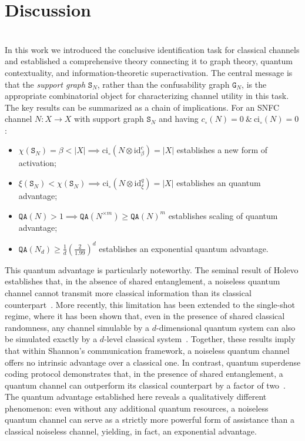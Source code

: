 \documentclass[12pt,a4paper]{article}
\begin{document}
\section{Discussion}\label{sec:discussion}

\vspace{-.35cm}\\ 

\noindent In this work we introduced the conclusive identification task for classical channels and established a comprehensive theory connecting it to graph theory, quantum contextuality, and information-theoretic superactivation. The central message is that the \emph{support graph} $\mathtt{S}_N$, rather than the confusability graph $\mathtt{G}_N$, is the appropriate combinatorial object for characterizing channel utility in this task. The key results can be summarized as a chain of implications. For an SNFC channel $N : X \to X$ with support graph $\mathtt{S}_N$ and having $c_\circ(N)=0~\&~\mathrm{ci}_\circ(N)=0$:
\begin{itemize}[itemsep=-0.15cm, parsep=0.15cm, topsep=2pt, leftmargin=1.0cm]
\item[$\checkmark$] $\chi(\mathtt{S}_N) = \beta < |X| \implies \mathrm{ci}_\circ(N \otimes \mathrm{id}^c_\beta) = |X|$ establishes a new form of activation;  
\item[$\checkmark$] $\xi(\mathtt{S}_N) < \chi(\mathtt{S}_N) \implies \mathrm{ci}_\circ(N \otimes \mathrm{id}^q_{\xi}) = |X|$ establishes an quantum advantage; 
\item[$\checkmark$] $\mathtt{QA}(N) > 1 \implies \mathtt{QA}(N^{\times m}) \geq \mathtt{QA}(N)^m$ establishes scaling of quantum advantage;
\item[$\checkmark$] $\mathtt{QA}(N_d)\geq \frac{1}{d}\left(\frac{2}{1.99}\right)^d$ establishes an exponential quantum advantage.
\end{itemize}
This quantum advantage is particularly noteworthy. The seminal result of Holevo establishes that, in the absence of shared entanglement, a noiseless quantum channel cannot transmit more classical information than its classical counterpart~\cite{Holevo1973}. More recently, this limitation has been extended to the single-shot regime, where it has been shown that, even in the presence of shared classical randomness, any channel simulable by a $d$-dimensional quantum system can also be simulated exactly by a $d$-level classical system~\cite{Frenkel2015}. Together, these results imply that within Shannon’s communication framework, a noiseless quantum channel offers no intrinsic advantage over a classical one. In contrast, quantum superdense coding protocol demonstrates that, in the presence of shared entanglement, a quantum channel can outperform its classical counterpart by a factor of two~\cite{Bennett1992}. The quantum advantage established here reveals a qualitatively different phenomenon: even without any additional quantum resources, a noiseless quantum channel can serve as a strictly more powerful form of assistance than a classical noiseless channel, yielding, in fact, an exponential advantage. \\    
\end{document}
